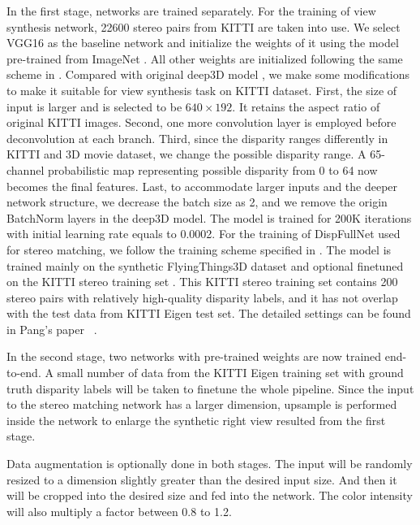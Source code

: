\documentclass[10pt,twocolumn,letterpaper]{article}
\begin{document}
In the first stage, networks are trained separately. For the training of view synthesis network, 22600 stereo pairs from KITTI are taken into use. We select VGG16 as the baseline network and initialize the weights of it using the model pre-trained from ImageNet \cite{Simonyan14c}. All other weights are initialized following the same scheme in \cite{xie2016deep3d}. Compared with original deep3D model \cite{xie2016deep3d}, we make some modifications to make it suitable for view synthesis task on KITTI dataset. First, the size of input is larger and is selected to be $640\times192$. It retains the aspect ratio of original KITTI images. Second, one more convolution layer is employed before deconvolution at each branch. Third, since the disparity ranges differently in KITTI and 3D movie dataset, we change the possible disparity range. A 65-channel probabilistic map representing possible disparity from 0 to 64 now becomes the final features. Last, to accommodate larger inputs and the deeper network structure, we decrease the batch size as 2, and we remove the origin BatchNorm layers in the deep3D model. The model is trained for 200K iterations with initial learning rate equals to 0.0002. For the training of DispFullNet used for stereo matching, we follow the training scheme specified in \cite{pang2017cascade}. The model is trained mainly on the synthetic FlyingThings3D dataset \cite{mayer2016disp} and optional finetuned on the KITTI stereo training set \cite{Menze2015CVPR}. This KITTI stereo training set contains 200 stereo pairs with relatively high-quality disparity labels, and it has not overlap with the test data from KITTI Eigen test set. The detailed settings can be found in Pang's paper \etal~\cite{pang2017cascade}.

In the second stage, two networks with pre-trained weights are now trained end-to-end. A small number of data from the KITTI Eigen training set with ground truth disparity labels will be taken to finetune the whole pipeline. Since the input to the stereo matching network has a larger dimension, upsample is performed inside the network to enlarge the synthetic right view resulted from the first stage.

Data augmentation is optionally done in both stages. The input will be randomly resized to a dimension slightly greater than the desired input size. And then it will be cropped into the desired size and fed into the network. The color intensity will also multiply a factor between 0.8 to 1.2.
\end{document}
